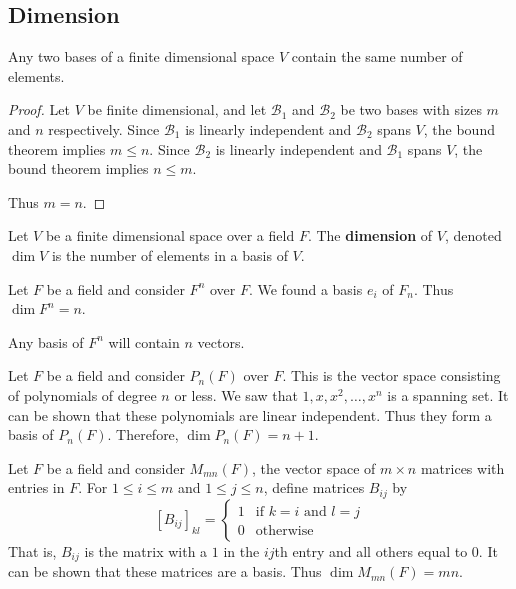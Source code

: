 \documentclass{article}
\begin{document}
  \subsection{Dimension}
  \begin{theorem}
    Any two bases of a finite dimensional space $V$ contain the same number of elements.
  \end{theorem}
  \begin{proof}
    Let $V$ be finite dimensional, and let $\mathcal{B}_1$ and $\mathcal{B}_2$ be two bases with sizes $m$ and $n$ respectively. Since $\mathcal{B}_1$ is linearly independent and $\mathcal{B}_2$ spans $V$, the bound theorem implies $m \leq n$. Since $\mathcal{B}_2$ is linearly independent and $\mathcal{B}_1$ spans $V$, the bound theorem implies $n \leq m$.

    Thus $m = n$.
  \end{proof}
  \begin{definition}
    Let $V$ be a finite dimensional space over a field $F$. The \textbf{dimension} of $V$, denoted $\dim V$ is the number of elements in a basis of $V$.
  \end{definition}
  \begin{example}
    Let $F$ be a field and consider $F^n$ over $F$. We found a basis $e_i$ of $F_n$. Thus $\dim F^n = n$.

    Any basis of $F^n$ will contain $n$ vectors.
  \end{example}
  \begin{example}
    Let $F$ be a field and consider $P_n(F)$ over $F$. This is the vector space consisting of polynomials of degree $n$ or less. We saw that $1, x, x^2, \ldots, x^n$ is a spanning set. It can be shown that these polynomials are linear independent. Thus they form a basis of $P_n(F)$. Therefore, $\dim P_n(F) = n + 1$.
  \end{example}
  \begin{example}
    Let $F$ be a field and consider $M_{mn}(F)$, the vector space of $m \times n$ matrices with entries in $F$. For $1 \leq i \leq m$ and $1 \leq j \leq n$, define matrices $B_{ij}$ by \[
      [B_{ij}]_{kl} =
      \begin{cases}
        1 &\text{if } k= i \text{ and } l = j\\
        0 &\text{otherwise}
      \end{cases}
    \]
    That is, $B_{ij}$ is the matrix with a $1$ in the $ij$th entry and all others equal to $0$. It can be shown that these matrices are a basis. Thus $\dim M_{mn}(F) = mn$.
  \end{example}
\end{document}
